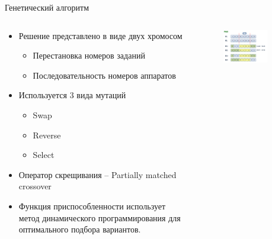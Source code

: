 \documentclass{beamer}
\begin{document}
\begin{frame}{Генетический алгоритм}
\begin{columns}[onlytextwidth]
    \begin{column}{0.6\textwidth}
        \begin{itemize}
            \item Решение представлено в виде двух хромосом
            \begin{itemize}
            \item Перестановка номеров заданий
            \item Последовательность номеров аппаратов
            \end{itemize}

            \item Используется 3 вида мутаций
            \begin{itemize}
            \item Swap
            \item Reverse
            \item Select
            \end{itemize}

            \item Оператор скрещивания -- Partially matched crossover
            \item Функция приспособленности использует метод динамического программирования для оптимального подбора вариантов.
        \end{itemize}

    \end{column}
    \begin{column}{0.4\textwidth}

        \begin{figure}[here]
            \includegraphics[scale=0.5]{images/300px-Pmx.png}
        \end{figure}
    \end{column}

​\end{columns}
\end{frame}
\end{document}
